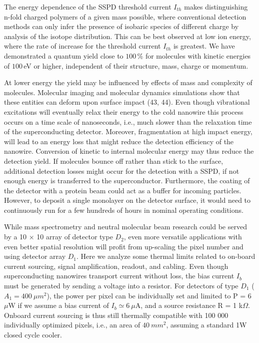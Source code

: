 \documentclass[12pt]{article}
\begin{document}
The energy dependence of the SSPD threshold current $I_{th}$ makes distinguishing n-fold charged polymers of a given mass possible, where conventional detection methods can only infer the presence of isobaric species of different charge by analysis of the isotope distribution. This can be best observed at low ion energy, where the rate of increase for the threshold current $I_{th}$ is greatest.
We have demonstrated a quantum yield close to $100\,$\% for molecules with kinetic energies of $100\,$eV or higher, independent of their structure, mass, charge or momentum. 

At lower energy the yield may be influenced by effects of mass and complexity of molecules. Molecular imaging and molecular dynamics simulations show that these entities can deform upon surface impact (43, 44). Even though vibrational excitations will eventually relax their energy to the cold nanowire this process occurs on a time scale of nanoseconds, i.e., much slower than the relaxation time of the superconducting detector. Moreover, fragmentation at high impact energy, will lead to an energy loss that might reduce the detection efficiency of the nanowire. Conversion of kinetic to internal molecular energy may thus reduce the detection yield. If molecules bounce off rather than stick to the surface, additional detection losses might occur for the detection with a SSPD, if not enough energy is transferred to the superconductor. Furthermore, the coating of the detector with a protein beam could act as a buffer for incoming particles. However, to deposit a single monolayer on the detector surface, it would need to continuously run for a few hundreds of hours in nominal operating conditions.  

While mass spectrometry and neutral molecular beam research could be served by a 10 $\times$ 10 array of detector type $D_2$, even more versatile applications with even better spatial resolution will profit from up-scaling the pixel number and using detector array $D_1$. Here we analyze some thermal limits related to on-board current sourcing, signal amplification, readout, and cabling. Even though superconducting nanowires transport current without loss, the bias current $I_b$ must be generated by sending a voltage into a resistor. For detectors of type $D_1$ ($A_1 = 400~ \mu m^2$), the power per pixel can be individually set and limited to P = 6 $\mu$W if we assume a bias current of $I_b \simeq 6 ~\mu$A, and a source resistance R = 1 k$\Omega$. Onboard current sourcing is thus still thermally compatible with 100 000 individually optimized pixels, i.e., an area of $40~mm^2$, assuming a standard 1W closed cycle cooler.  
\end{document}
